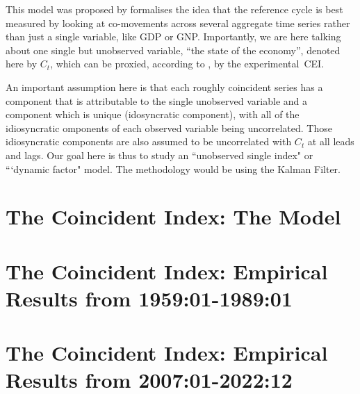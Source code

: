 \documentclass[12pt]{article}
\begin{document}
	\maketitle
	This model was proposed by   formalises the idea that  the reference cycle is best measured  by looking at co-movements  across several aggregate time series rather than just a single variable, like GDP or  GNP. Importantly, we are here talking about one single but unobserved variable, ``the state of the economy'', denoted here by $C_t$, which can be proxied, according to \cite{stock1988probability, stock&watson1989indexes}, by the experimental~CEI.
	
	An important assumption here is that each roughly coincident series has a component that is attributable to the single unobserved variable and a component which is unique  (idosyncratic component), with all of the idiosyncratic omponents of each observed variable being uncorrelated. Those idiosyncratic components are also assumed to be uncorrelated with $C_t$ at all leads and lags. Our goal here is thus to study an ``unobserved single index" or ```dynamic factor" model. The methodology would be using the Kalman Filter.
	
	\section{The Coincident Index: The Model }
		
	
	\section{The Coincident Index: Empirical Results from 1959:01-1989:01}
		

	\section{The Coincident Index: Empirical Results from 2007:01-2022:12}
		
	


%
%	
%	
	
%	
	\newpage
	
	
\end{document}
